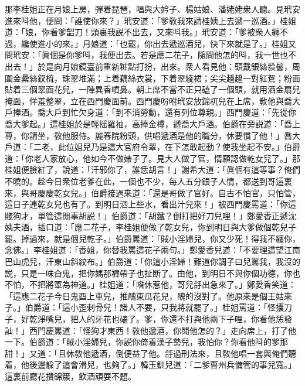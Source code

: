 那李桂姐正在月娘上房，彈着琵琶，唱與大妗子、楊姑娘、潘姥姥衆人聽。見玳安進來呌他，便問：「誰使你來？」玳安道：「爹敎我來請桂姨上去遞一巡酒。」桂姐道：「娘，你看爹韶刀！頭裏我説不出去，又來呌我。」玳安道：「爹被衆人纏不過，纔使進小的來。」月娘道：「也罷，你出去遞巡酒兒，快下來就是了。」桂姐又問玳安：「眞個是你爹呌，我便出去。若是應二花子，隨問他怎的呌，我一世也不出去！」於是向月娘鏡臺前重新粧點打扮，出來。衆人看見他：頭戴銀絲䯼髻，周圍金纍絲釵梳，珠翠堆滿；上着藕絲衣裳，下着翠綾裙；尖尖趫趫一對紅鴛；粉面貼着三個翠面花兒，一陣異香噴鼻。朝上席不當不正只磕了一個頭，就用洒金扇兒掩面，佯羞整翠，立在西門慶面前。西門慶吩咐玳安放錦杌兒在上席，敎他與喬大戶捧酒。喬大戶到忙欠身道：「到不消勞動，還有列位尊親。」西門慶道：「先從你喬大爹起。」這桂姐於是輕摇羅袖，高捧金樽，遞喬大戶酒。伯爵在旁説道：「喬上尊，你請坐，敎他服侍。麗春院粉頭，供唱遞酒是他的職分，休要慣了他！」喬大戶道：「二老，此位姐兒乃是這大官府令翠，在下怎敢起動？使我坐起不安。」伯爵道：「你老人家放心，他如今不做婊子了。見大人做了官，情願認做乾女兒了。」那桂姐便臉紅了，說道：「汗邪你了，誰恁胡言！」謝希大道：「眞個有這等事？俺們不曉的。趁今日衆位老爹在此，一個也不少，每人五分銀子人情，都送到哥這裏來，與哥慶慶乾女兒。」伯爵接過來道：「還是哥做了官好。自古不怕官，只怕管，這日子連乾女兒也有了。到明日洒上些水，看出汁兒來！」被西門慶罵道：「你這賤狗才，單管這閒事胡説！」伯爵道：「胡鐵？倒打把好刀兒哩！」鄭愛香正遞沈姨夫酒，插口道：「應二花子，李桂姐便做了乾女兒，你到明日與大爹做個乾兒子罷。掉過來，就是個兒乾子。」伯爵罵道：「賊小淫婦兒，你又少死！得我不纏你，念佛。」李桂姐道：「香姐，你替我罵這花子兩句。」鄭愛香兒道：「不要理這望江南巴山虎兒，汗東山斜紋布。」伯爵道：「你這小淫婦！難道你調子曰兒罵我，我沒的説，只是一味㒲鬼，把你媽那褲帶子也扯断了。由他，到明日不與你個功德，你也不怕，不把將軍為神道。」桂姐道：「喒休惹他，哥兒㧱出急來了。」鄭愛香笑道：「這應二花子今日鬼酉上車兒，推醜東瓜花兒，醜的沒對了。他原來是個王姑來子。」伯爵道：「這小歪剌骨兒！諸人不要，只我將就罷了。」桂姐罵道：「怪攮刀子，好乾淨嘴兒，把人的牙花也磕了。爹，你還不打與他兩下子哩，你看他恁發訕！」西門慶罵道：「怪狗才東西！敎他遞酒，你鬦他怎的？」走向席上，打了他一下。伯爵道：「賊小淫婦兒，你説你倚着漢子勢兒，我怕你？你看他呌的爹那甜！」又道：「且休敎他遞酒，倒便益了他。㧱過刑法來，且敎他唱一套與俺們聽着，他後邊躱了這會滑兒，也夠了。」韓玉釧兒道：「二爹曹州兵備管的事兒寬。」這裏前廳花攢錦簇，飲酒頑耍不題。

